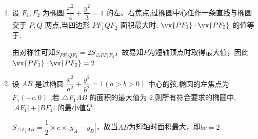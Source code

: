 \begin{enumerate}
\begin{jieda}
        设$P$在$AB$上，且$OP \perp AB$，故$|OP| = \sqrt{3}$，根据相似三角形可知$|AP| \cdot |BP| = 3$，根据基本不等式可知$|AP| + |BP| \geq 2\sqrt{3}$，因此$S \geq 3$
    \end{jieda}
    \item 设 ${F}_{1},{F}_{2}$ 为椭圆 $\dfrac{{x}^{2}}{4} + \dfrac{{y}^{2}}{3} = 1$ 的左、右焦点,过椭圆中心任作一条直线与椭圆交于 $P,Q$ 两点,当四边形 $P{F}_{1}Q{F}_{2}$ 面积最大时, $\vv{P{F}_{1}} \cdot  \vv{P{F}_{2}}$ 的值等于.
    \begin{jieda}
        由对称性可知$S_{P{F}_{1}Q{F}_{2}} = 2S_{\triangle PF_1F_2}$，故易知$P$为短轴顶点时取得最大值，因此$\vv{PF_1} \cdot \vv{PF_2} = 2$
    \end{jieda}
    \item 设 ${AB}$ 是过椭圆 $\dfrac{{x}^{2}}{{a}^{2}} + \dfrac{{y}^{2}}{{b}^{2}} = 1\left( {a > b > 0}\right)$ 中心的弦,椭圆的左焦点为 ${F}_{1}\left( {-c,0}\right)$ ,若 $\bigtriangleup {F}_{1}{AB}$ 的面积的最大值为 2,则所有符合要求的椭圆中, $\left| {A{F}_{1}}\right|  + \left| {B{F}_{1}}\right|$ 的最小值是.
    \begin{jieda}
        $S_{\bigtriangleup {F}_{1}{AB}} = \dfrac{1}{2} \times c \times |y_A - y_B|$，故当$AB$为短轴时面积最大，即$bc = 2$
        

\end{jieda}
\end{enumerate}
